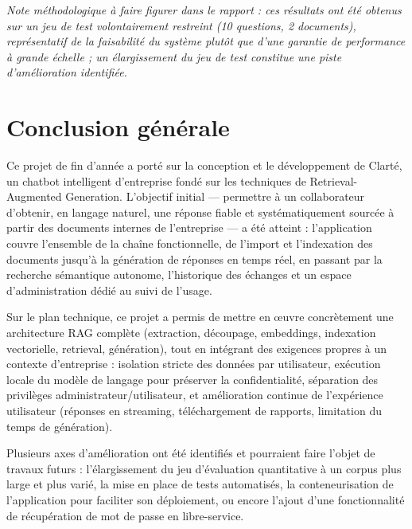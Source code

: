 \documentclass[12pt,a4paper]{report}
\begin{document}
\textit{Note méthodologique à faire figurer dans le rapport : ces résultats ont été obtenus sur un jeu de test volontairement restreint (10 questions, 2 documents), représentatif de la faisabilité du système plutôt que d'une garantie de performance à grande échelle ; un élargissement du jeu de test constitue une piste d'amélioration identifiée.}

\chapter*{Conclusion générale}

Ce projet de fin d'année a porté sur la conception et le développement de Clarté, un chatbot intelligent d'entreprise fondé sur les techniques de Retrieval-Augmented Generation. L'objectif initial — permettre à un collaborateur d'obtenir, en langage naturel, une réponse fiable et systématiquement sourcée à partir des documents internes de l'entreprise — a été atteint : l'application couvre l'ensemble de la chaîne fonctionnelle, de l'import et l'indexation des documents jusqu'à la génération de réponses en temps réel, en passant par la recherche sémantique autonome, l'historique des échanges et un espace d'administration dédié au suivi de l'usage.

Sur le plan technique, ce projet a permis de mettre en œuvre concrètement une architecture RAG complète (extraction, découpage, embeddings, indexation vectorielle, retrieval, génération), tout en intégrant des exigences propres à un contexte d'entreprise : isolation stricte des données par utilisateur, exécution locale du modèle de langage pour préserver la confidentialité, séparation des privilèges administrateur/utilisateur, et amélioration continue de l'expérience utilisateur (réponses en streaming, téléchargement de rapports, limitation du temps de génération).

Plusieurs axes d'amélioration ont été identifiés et pourraient faire l'objet de travaux futurs : l'élargissement du jeu d'évaluation quantitative à un corpus plus large et plus varié, la mise en place de tests automatisés, la conteneurisation de l'application pour faciliter son déploiement, ou encore l'ajout d'une fonctionnalité de récupération de mot de passe en libre-service.

\end{document}
